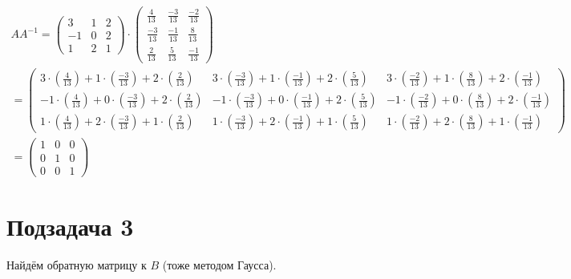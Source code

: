 \documentclass[12pt, a4paper]{article}
\begin{document}
    \begin{multline}
        A A^{-1} = \left(\begin{matrix}
            3 & 1 & 2 \\
            -1 & 0 & 2 \\
            1 & 2 & 1
        \end{matrix}\right) \cdot \left(\begin{matrix}
            \frac{4}{13} & \frac{-3}{13} & \frac{-2}{13} \\
            \frac{-3}{13} & \frac{-1}{13} & \frac{8}{13} \\
            \frac{2}{13} & \frac{5}{13} & \frac{-1}{13}
        \end{matrix}\right) \\ = \left(\begin{matrix}
            3\cdot \left(\frac{4}{13}\right)+1\cdot \left(\frac{-3}{13}\right)+2\cdot \left(\frac{2}{13}\right) & 3\cdot \left(\frac{-3}{13}\right)+1\cdot \left(\frac{-1}{13}\right)+2\cdot \left(\frac{5}{13}\right) & 3\cdot \left(\frac{-2}{13}\right)+1\cdot \left(\frac{8}{13}\right)+2\cdot \left(\frac{-1}{13}\right) \\
            -1\cdot \left(\frac{4}{13}\right)+0\cdot \left(\frac{-3}{13}\right)+2\cdot \left(\frac{2}{13}\right) & -1\cdot \left(\frac{-3}{13}\right)+0\cdot \left(\frac{-1}{13}\right)+2\cdot \left(\frac{5}{13}\right) & -1\cdot \left(\frac{-2}{13}\right)+0\cdot \left(\frac{8}{13}\right)+2\cdot \left(\frac{-1}{13}\right) \\
            1\cdot \left(\frac{4}{13}\right)+2\cdot \left(\frac{-3}{13}\right)+1\cdot \left(\frac{2}{13}\right) & 1\cdot \left(\frac{-3}{13}\right)+2\cdot \left(\frac{-1}{13}\right)+1\cdot \left(\frac{5}{13}\right) & 1\cdot \left(\frac{-2}{13}\right)+2\cdot \left(\frac{8}{13}\right)+1\cdot \left(\frac{-1}{13}\right)
        \end{matrix}\right) \\ = \left(\begin{matrix}
            1 & 0 & 0 \\
            0 & 1 & 0 \\
            0 & 0 & 1
        \end{matrix}\right)
    \end{multline}
    
    \section{Подзадача 3}
    Найдём обратную матрицу к $B$ (тоже методом Гаусса).
\end{document}
